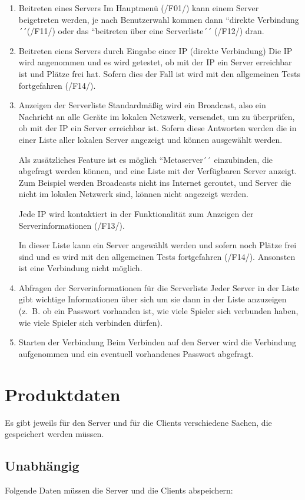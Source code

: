 \documentclass[a4paper,10pt]{article}
\begin{document}
\begin{enumerate}[/F01/]
\item Beitreten eines Servers
Im Hauptmenü (\rightarrow /F01/) kann einem Server beigetreten werden, je nach Benutzerwahl kommen dann ``direkte Verbindung´´(\rightarrow /F11/) oder das ``beitreten über eine Serverliste´´ (\rightarrow /F12/) dran.

\item Beitreten eiens Servers durch Eingabe einer IP (direkte Verbindung)
Die IP wird angenommen und es wird getestet, ob mit der IP ein Server erreichbar ist und Plätze frei hat. Sofern dies der Fall ist wird mit den allgemeinen Tests fortgefahren (\rightarrow /F14/).

\item Anzeigen der Serverliste
Standardmäßig wird ein Broadcast, also ein Nachricht an alle Geräte im lokalen Netzwerk, versendet, um zu überprüfen, ob mit der IP ein Server erreichbar ist. Sofern diese Antworten werden die in einer Liste aller lokalen Server angezeigt und können ausgewählt werden.

Als zusätzliches Feature ist es möglich ``Metaserver´´ einzubinden, die abgefragt werden können, und eine Liste mit der Verfügbaren Server anzeigt. Zum Beispiel werden Broadcasts nicht ins Internet geroutet, und Server die nicht im lokalen Netzwerk sind, können nicht angezeigt werden.

Jede IP wird kontaktiert in der Funktionalität zum Anzeigen der Serverinformationen (\rightarrow /F13/).

In dieser Liste kann ein Server angewählt werden und sofern noch Plätze frei sind und es wird mit den allgemeinen Tests fortgefahren (\rightarrow /F14/). Ansonsten ist eine Verbindung nicht möglich.
\item Abfragen der Serverinformationen für die Serverliste
Jeder Server in der Liste gibt wichtige Informationen über sich um sie dann in der Liste anzuzeigen (z.~B. ob ein Passwort vorhanden ist, wie viele Spieler sich verbunden haben, wie viele Spieler sich verbinden dürfen).
\item Starten der Verbindung
Beim Verbinden auf den Server wird die Verbindung aufgenommen und ein eventuell vorhandenes Passwort abgefragt.
\end{enumerate}
\section{Produktdaten}
Es gibt jeweils für den Server und für die Clients verschiedene Sachen, die gespeichert werden müssen.
\subsection{Unabhängig}
Folgende Daten müssen die Server und die Clients abspeichern:
\end{document}
